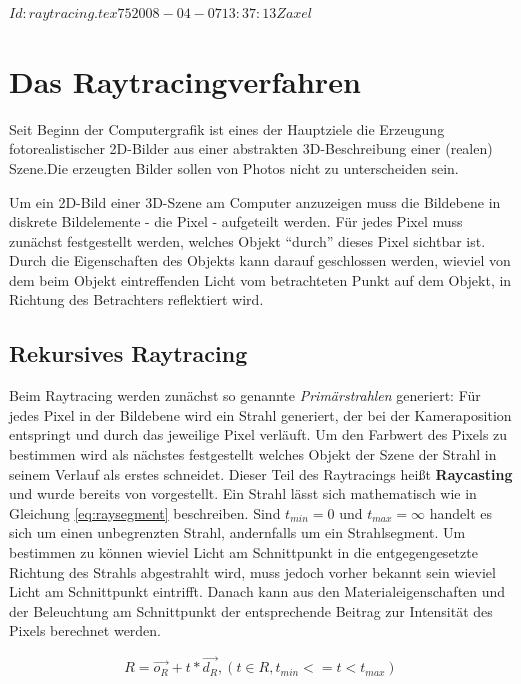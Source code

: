 \svnInfo $Id: raytracing.tex 75 2008-04-07 13:37:13Z axel $
\chapter{Das Raytracingverfahren}
\label{chap:rt}
Seit Beginn der Computergrafik ist eines der Hauptziele die Erzeugung fotorealistischer 2D-Bilder aus einer abstrakten 3D-Beschreibung einer (realen) Szene.Die erzeugten Bilder sollen von Photos nicht zu unterscheiden sein.

Um ein 2D-Bild einer 3D-Szene am Computer anzuzeigen muss die Bildebene in diskrete Bildelemente - die Pixel - aufgeteilt werden. Für jedes Pixel muss zunächst festgestellt werden, welches Objekt ``durch'' dieses Pixel sichtbar ist.
Durch die Eigenschaften des Objekts kann darauf geschlossen werden, wieviel von dem beim Objekt eintreffenden Licht vom betrachteten Punkt auf dem Objekt, in Richtung des Betrachters reflektiert wird.


\section{Rekursives Raytracing}

Beim Raytracing werden zunächst so genannte \textit{Primärstrahlen} generiert: Für jedes Pixel in der Bildebene wird ein Strahl generiert, der bei der Kameraposition entspringt und durch das jeweilige Pixel verläuft. Um den Farbwert des Pixels zu bestimmen wird als nächstes festgestellt welches Objekt der Szene der Strahl in seinem Verlauf als erstes schneidet. Dieser Teil des Raytracings heißt \textbf{Raycasting} und wurde bereits von \cite{Appel68} vorgestellt. Ein Strahl lässt sich mathematisch wie in Gleichung \ref{eq:raysegment} beschreiben. Sind $t_{min} = 0$ und $t_{max} = \infty$ handelt es sich um einen unbegrenzten Strahl, andernfalls um ein Strahlsegment.
Um bestimmen zu können wieviel Licht am Schnittpunkt in die entgegengesetzte Richtung des Strahls abgestrahlt wird, muss jedoch vorher bekannt sein wieviel Licht am Schnittpunkt eintrifft. Danach kann aus den Materialeigenschaften und der Beleuchtung am Schnittpunkt der entsprechende Beitrag zur Intensität des Pixels berechnet werden.

\begin{equation} 
  R = \vec{o_R} + t * \vec{d_R},
  (t \in R, t_{min} <= t < t_{max})
\label{eq:raysegment}
\end{equation}

